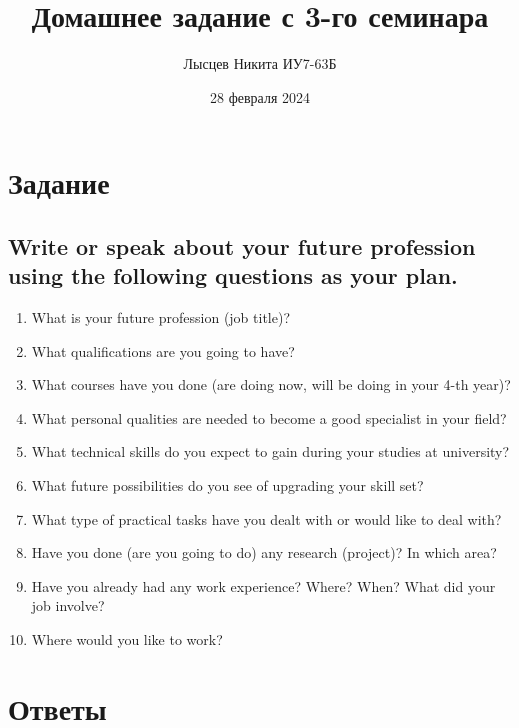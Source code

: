 \documentclass[a4paper,14pt, unknownkeysallowed]{extreport}
\title{Домашнее задание с 3-го семинара}
\author{Лысцев Никита ИУ7-63Б}
\date{28 февраля 2024}
\begin{document}
	\maketitle
	
\section*{Задание}

\subsection*{Write or speak about your future profession using the following questions as your plan.}

\begin{enumerate}
	\item What is your future profession (job title)?
	\item What qualifications are you going to have?
	\item What courses have you done (are doing now, will be doing in your 4-th
	year)?
	\item What personal qualities are needed to become a good specialist in your field?
	\item What technical skills do you expect to gain during your studies at
	university?
	\item What future possibilities do you see of upgrading your skill set?
	\item What type of practical tasks have you dealt with or would like to deal with?
	\item Have you done (are you going to do) any research (project)? In which
	area?
	\item Have you already had any work experience? Where? When? What did your job involve?
	\item Where would you like to work?
\end{enumerate}

\section*{Ответы}
\end{document}
